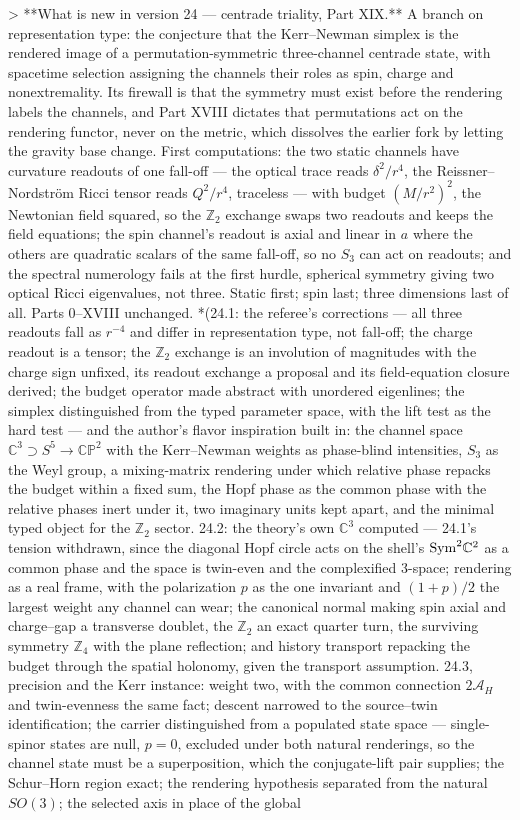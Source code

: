 > **What is new in version 24 — centrade triality, Part XIX.** A branch on representation type: the conjecture that the Kerr–Newman simplex is the rendered image of a permutation-symmetric three-channel centrade state, with spacetime selection assigning the channels their roles as spin, charge and nonextremality. Its firewall is that the symmetry must exist before the rendering labels the channels, and Part XVIII dictates that permutations act on the rendering functor, never on the metric, which dissolves the earlier fork by letting the gravity base change. First computations: the two static channels have curvature readouts of one fall-off — the optical trace reads $\delta^2/r^4$, the Reissner–Nordström Ricci tensor reads $Q^2/r^4$, traceless — with budget $(M/r^2)^2$, the Newtonian field squared, so the $\mathbb Z_2$ exchange swaps two readouts and keeps the field equations; the spin channel's readout is axial and linear in $a$ where the others are quadratic scalars of the same fall-off, so no $S_3$ can act on readouts; and the spectral numerology fails at the first hurdle, spherical symmetry giving two optical Ricci eigenvalues, not three. Static first; spin last; three dimensions last of all. Parts 0–XVIII unchanged. *(24.1: the referee's corrections — all three readouts fall as $r^{-4}$ and differ in representation type, not fall-off; the charge readout is a tensor; the $\mathbb Z_2$ exchange is an involution of magnitudes with the charge sign unfixed, its readout exchange a proposal and its field-equation closure derived; the budget operator made abstract with unordered eigenlines; the simplex distinguished from the typed parameter space, with the lift test as the hard test — and the author's flavor inspiration built in: the channel space $\mathbb C^3\supset S^5\to\mathbb{CP}^2$ with the Kerr–Newman weights as phase-blind intensities, $S_3$ as the Weyl group, a mixing-matrix rendering under which relative phase repacks the budget within a fixed sum, the Hopf phase as the common phase with the relative phases inert under it, two imaginary units kept apart, and the minimal typed object for the $\mathbb Z_2$ sector. 24.2: the theory's own $\mathbb C^3$ computed — 24.1's tension withdrawn, since the diagonal Hopf circle acts on the shell's ${\rm Sym}^2\mathbb C^2$ as a common phase and the space is twin-even and the complexified 3-space; rendering as a real frame, with the polarization $p$ as the one invariant and $(1+p)/2$ the largest weight any channel can wear; the canonical normal making spin axial and charge–gap a transverse doublet, the $\mathbb Z_2$ an exact quarter turn, the surviving symmetry $\mathbb Z_4$ with the plane reflection; and history transport repacking the budget through the spatial holonomy, given the transport assumption. 24.3, precision and the Kerr instance: weight two, with the common connection $2\mathcal A_H$ and twin-evenness the same fact; descent narrowed to the source–twin identification; the carrier distinguished from a populated state space — single-spinor states are null, $p = 0$, excluded under both natural renderings, so the channel state must be a superposition, which the conjugate-lift pair supplies; the Schur–Horn region exact; the rendering hypothesis separated from the natural $SO(3)$; the selected axis in place of the global 